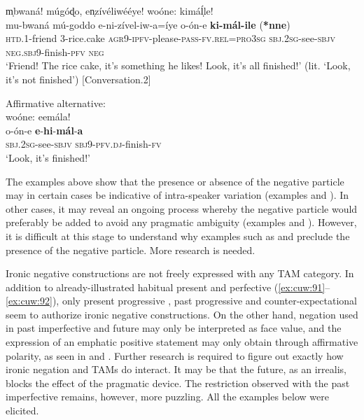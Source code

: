 \documentclass[output=paper,colorlinks=true, citecolor=brown,draftmode]{langscibook}
\begin{document}
\ea\label{ex:cuw:92}
    \ea\label{ex:cuw:92a} m̩bwaná! múgóɖo, en̩zívéliwééye! woóne: kimáĺ̩le!  \\ 
        \gll   mu-bwaná mú-goddo e-ni-zível-iw-a=íye o-ón-e \textbf{ki-mál-ile} (\textbf{*nne}) \\
              \textsc{htd.1}{}-friend 3-rice.cake \textsc{agr}9-\textsc{ipfv}{}-please-\textsc{pass-fv.rel=pro3sg} \textsc{sbj.2sg}{}-see-\textsc{sbjv} \textsc{neg.sbj9}{}-finish-\textsc{pfv} \textsc{neg} \\
        \glt  ‘Friend! The rice cake, it’s something he likes! Look, it’s all finished!’ (lit. ‘Look, it's not finished') [Conversation.2]

    \ex\label{ex:cuw:92b} Affirmative alternative: \\
            woóne: eemála! \\
        \gll  o-ón-e \textbf{e}{}-\textbf{hi}{}-\textbf{mál}{}-\textbf{a}  \\
              \textsc{sbj.2sg}-see-\textsc{sbjv} \textsc{sbj9-pfv.dj}{}-finish-\textsc{fv} \\
        \glt ‘Look, it's finished!'
    \z
\z 

The examples above show that the presence or absence of the negative particle may in certain cases be indicative of intra-speaker variation (examples  and ). In other cases, it may reveal an ongoing process whereby the negative particle would preferably be added to avoid any pragmatic ambiguity (examples  and ). However, it is difficult at this stage to understand why examples such as  and  preclude the presence of the negative particle. More research is needed.

Ironic negative constructions are not freely expressed with any TAM category. In addition to already-illustrated habitual present  and perfective (\ref{ex:cuw:91}--\ref{ex:cuw:92}), only present progressive , past progressive  and counter-expectational  seem to authorize ironic negative constructions. On the other hand, negation used in past imperfective  and future  may only be interpreted as face value, and the expression of an emphatic positive statement may only obtain through affirmative polarity, as seen in  and . Further research is required to figure out exactly how ironic negation and TAMs do interact. It may be that the future, as an irrealis, blocks the effect of the pragmatic device. The restriction observed with the past imperfective remains, however, more puzzling. All the examples below were elicited.
\end{document}
